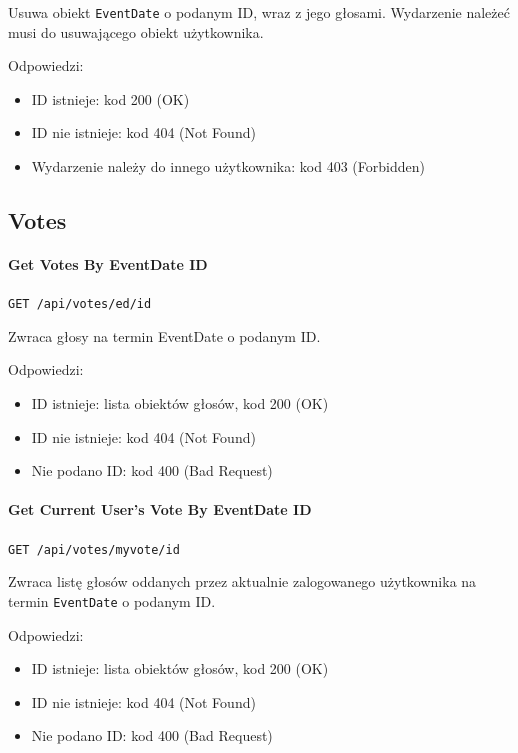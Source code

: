 \documentclass[a4paper,twoside,12pt]{book}
\begin{document}
Usuwa obiekt \texttt{EventDate} o podanym ID, wraz z jego głosami. Wydarzenie należeć musi do usuwającego obiekt użytkownika.

Odpowiedzi: 
\begin{itemize}
	\item ID istnieje: kod 200 (OK) 
	\item ID nie istnieje: kod 404 (Not Found)
	\item Wydarzenie należy do innego użytkownika: kod 403 (Forbidden) 
\end{itemize}

\subsection{Votes}

\paragraph{Get Votes By EventDate ID}

\texttt{GET /api/votes/ed/{id}}

Zwraca głosy na termin EventDate o podanym ID.

Odpowiedzi: 
\begin{itemize}
	\item ID istnieje: lista obiektów głosów, kod 200 (OK) 
	\item ID nie istnieje: kod 404 (Not Found) 
	\item Nie podano ID: kod 400 (Bad Request)
\end{itemize}

\paragraph{Get Current User's Vote By EventDate ID}

\texttt{GET /api/votes/myvote/{id}}

Zwraca listę głosów oddanych przez aktualnie zalogowanego użytkownika na termin \texttt{EventDate} o podanym ID.

Odpowiedzi: 
\begin{itemize}
	\item ID istnieje: lista obiektów głosów, kod 200 (OK) 
	\item ID nie istnieje: kod 404 (Not Found) 
	\item Nie podano ID: kod 400 (Bad Request)
\end{itemize}
\end{document}
